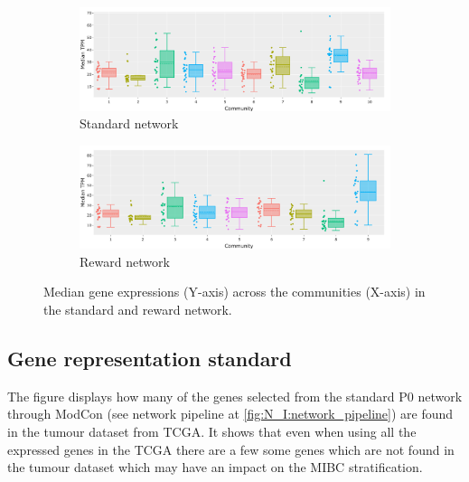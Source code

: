 \begin{figure}[H]
    \centering
    \begin{subfigure}[!t]{1.0\textwidth}
    \includegraphics[width=\textwidth,keepaspectratio]{Sections/Network_I/Resources/P0/Comms/P0_standard_4K_50TF_med.png}
        \caption{Standard network}
        \label{fig:ap:p0_chg_std_exp}
    \end{subfigure}
    \begin{subfigure}[!t]{1.0\textwidth}
        \includegraphics[width=\textwidth,keepaspectratio]{Sections/Network_I/Resources/P0/Comms/P0_norm3_4K_50TF_med.png}
            \caption{Reward network}
            \label{fig:ap:p0_chg_rwd_exp}
    \end{subfigure}
    \caption[P0 tum: median expression in P0 communities]{Median gene expressions (Y-axis) across the communities (X-axis) in the standard and reward network.}
    \label{fig:ap:p0_ge_chgs}
\end{figure}

\newpage
\subsection{Gene representation standard} \label{s:ap:p0_gene_rep_std}

The figure displays how many of the genes selected from the standard P0 network through ModCon (see network pipeline at \cref{fig:N_I:network_pipeline}) are found in the tumour dataset from TCGA. It shows that even when using all the expressed genes in the TCGA there are a few some genes which are not found in the tumour dataset which may have an impact on the MIBC stratification.

